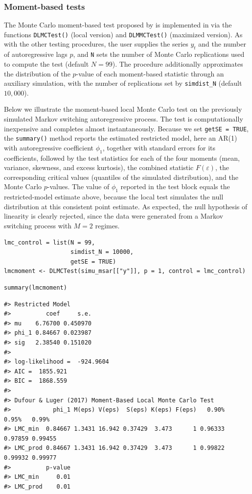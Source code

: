 \subsubsection{Moment-based tests}\label{moment-based-tests-1}

The Monte Carlo moment-based test proposed by \citet{dufourluger17} is implemented in  via the functions \texttt{DLMCTest()} (local version) and \texttt{DLMMCTest()} (maximized version). As with the other testing procedures, the user supplies the series \(y_t\) and the number of autoregressive lags \(p\), and \texttt{N} sets the number of Monte Carlo replications used to compute the test (default \(N = 99\)). The procedure additionally approximates the distribution of the \(p\)-value of each moment-based statistic through an auxiliary simulation, with the number of replications set by \texttt{simdist\_N} (default \(10{,}000\)).

Below we illustrate the moment-based local Monte Carlo test on the previously simulated Markov switching autoregressive process. The test is computationally inexpensive and completes almost instantaneously. Because we set \texttt{getSE\ =\ TRUE}, the \texttt{summary()} method reports the estimated restricted model, here an AR(1) with autoregressive coefficient \(\phi_1\), together with standard errors for its coefficients, followed by the test statistics for each of the four moments (mean, variance, skewness, and excess kurtosis), the combined statistic \(F(\varepsilon)\), the corresponding critical values (quantiles of the simulated distribution), and the Monte Carlo \(p\)-values. The value of \(\phi_1\) reported in the test block equals the restricted-model estimate above, because the local test simulates the null distribution at this consistent point estimate. As expected, the null hypothesis of linearity is clearly rejected, since the data were generated from a Markov switching process with \(M = 2\) regimes.

\begin{verbatim}
lmc_control = list(N = 99,
                   simdist_N = 10000,
                   getSE = TRUE)
lmcmoment <- DLMCTest(simu_msar[["y"]], p = 1, control = lmc_control)
\end{verbatim}

\begin{verbatim}
summary(lmcmoment)
\end{verbatim}

\begin{verbatim}
#> Restricted Model
#>          coef     s.e.
#> mu    6.76700 0.450970
#> phi_1 0.84667 0.023987
#> sig   2.38540 0.151020
#> 
#> log-likelihood =  -924.9604
#> AIC =  1855.921
#> BIC =  1868.559
#> 
#> Dufour & Luger (2017) Moment-Based Local Monte Carlo Test
#>            phi_1 M(eps) V(eps)  S(eps) K(eps) F(eps)   0.90%   0.95%   0.99%
#> LMC_min  0.84667 1.3431 16.942 0.37429  3.473      1 0.96333 0.97859 0.99455
#> LMC_prod 0.84667 1.3431 16.942 0.37429  3.473      1 0.99822 0.99932 0.99977
#>          p-value
#> LMC_min     0.01
#> LMC_prod    0.01
\end{verbatim}


